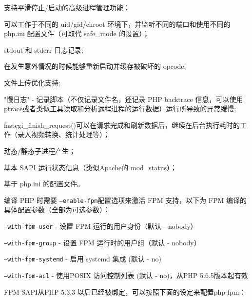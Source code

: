 \begin{compactitem}
\item 支持平滑停止/启动的高级进程管理功能；

\item 可以工作于不同的 uid/gid/chroot 环境下，并监听不同的端口和使用不同的 php.ini 配置文件（可取代 safe\_mode 的设置）；

\item stdout 和 stderr 日志记录;

\item 在发生意外情况的时候能够重新启动并缓存被破坏的 opcode;

\item 文件上传优化支持;

\item "慢日志" - 记录脚本（不仅记录文件名，还记录 PHP backtrace 信息，可以使用 ptrace或者类似工具读取和分析远程进程的运行数据）运行所导致的异常缓慢;

\item fastcgi\_finish\_request()可以在请求完成和刷新数据后，继续在后台执行耗时的工作（录入视频转换、统计处理等）；

\item 动态/静态子进程产生；

\item 基本 SAPI 运行状态信息（类似Apache的 mod\_status）；

\item 基于 php.ini 的配置文件。

\end{compactitem}

编译 PHP 时需要 \texttt{--enable-fpm}配置选项来激活 FPM 支持，以下为 FPM 编译的具体配置参数（全部为可选参数）：

\begin{compactitem}
\item \texttt{--with-fpm-user} - 设置 FPM 运行的用户身份（默认 - nobody）

\item \texttt{--with-fpm-group} - 设置 FPM 运行时的用户组（默认 - nobody）

\item \texttt{--with-fpm-systemd} - 启用 systemd 集成 (默认 - no)

\item \texttt{--with-fpm-acl} - 使用POSIX 访问控制列表 (默认 - no)，从PHP 5.6.5版本起有效
\end{compactitem}



FPM SAPI从PHP 5.3.3 以后已经被绑定，可以按照下面的设定来配置php-fpm：


